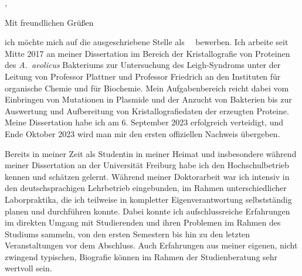 



\recipient{\firma{}}{\adresse{}}
\opening{\anrede{},}
\date{\today}
\closing{Mit freundlichen Grüßen}
{}
\makelettertitle
\justifying



ich möchte mich auf die ausgeschriebene Stelle als \stelleText~\firmaText~bewerben. Ich arbeite seit Mitte 2017 an meiner Dissertation im Bereich der Kristallografie von Proteinen des \mbox{\textit{A. aeolicus}} Bakteriums zur Untersuchung des Leigh-Syndroms unter der Leitung von Professor Plattner und Professor Friedrich an den Instituten für organische Chemie und für Biochemie. 
Mein Aufgabenbereich reicht dabei vom Einbringen von Mutationen in Plasmide und der Anzucht von Bakterien bis zur Auswertung und Aufbereitung von Kristallografiedaten der erzeugten Proteine. 
Meine Dissertation habe ich am 6. September 2023 erfolgreich verteidigt, und Ende Oktober 2023 wird man mir den ersten offiziellen Nachweis übergeben. \par
    {Bereits in meiner Zeit als Studentin in meiner Heimat und insbesondere während meiner Dissertation an der Universität Freiburg habe ich den Hochschulbetrieb kennen und schätzen gelernt. Während meiner Doktorarbeit war ich intensiv in den deutschsprachigen Lehrbetrieb eingebunden, im Rahmen unterschiedlicher Laborpraktika, die ich teilweise in kompletter Eigenverantwortung selbstständig planen und durchführen konnte. Dabei konnte ich aufschlussreiche Erfahrungen im direkten Umgang mit Studierenden und ihren Problemen im Rahmen des Studiums sammeln, von den ersten Semestern bis hin zu den letzten Veranstaltungen vor dem Abschluss. Auch Erfahrungen aus meiner eigenen, nicht zwingend typischen, Biografie können im Rahmen der Studienberatung sehr wertvoll sein.}{}
